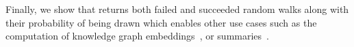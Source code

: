 \noindent Finally, we show that \NAME returns both failed and
succeeded random walks along with their probability of being drawn
which enables other use cases such as the computation of knowledge
graph embeddings~\cite{ristoski2016rdf2vec}, or
summaries~\cite{10.1007/978-3-030-49461-2_10}.

